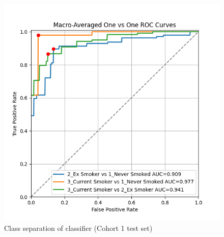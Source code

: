\documentclass{article}
\begin{document}
\begin{figure}
    \centering
    \includegraphics[width=0.75\linewidth]{cohort1_macro_ovo_roc.png}
    \caption{Class separation of classifier (Cohort 1 test set)}
    \label{fig:macro-roc-cohort1}
\end{figure}
\end{document}
